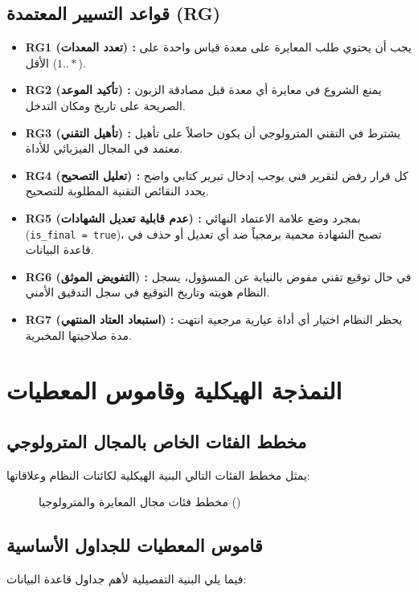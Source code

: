 \documentclass{bts-report-ar}
\begin{document}
\subsection{قواعد التسيير المعتمدة (RG)}
\begin{itemize}
  \item \textbf{RG1 (تعدد المعدات) :} يجب أن يحتوي طلب المعايرة على معدة قياس واحدة على الأقل ($1..*$).
  \item \textbf{RG2 (تأكيد الموعد) :} يمنع الشروع في معايرة أي معدة قبل مصادقة الزبون الصريحة على تاريخ ومكان التدخل.
  \item \textbf{RG3 (تأهيل التقني) :} يشترط في التقني المترولوجي أن يكون حاصلاً على تأهيل معتمد في المجال الفيزيائي للأداة.
  \item \textbf{RG4 (تعليل التصحيح) :} كل قرار رفض لتقرير فني يوجب إدخال تبرير كتابي واضح يحدد النقائص التقنية المطلوبة للتصحيح.
  \item \textbf{RG5 (عدم قابلية تعديل الشهادات) :} بمجرد وضع علامة الاعتماد النهائي (\texttt{is\_final = true})، تصبح الشهادة محمية برمجياً ضد أي تعديل أو حذف في قاعدة البيانات.
  \item \textbf{RG6 (التفويض الموثق) :} في حال توقيع تقني مفوض بالنيابة عن المسؤول، يسجل النظام هويته وتاريخ التوقيع في سجل التدقيق الأمني.
  \item \textbf{RG7 (استبعاد العتاد المنتهي) :} يحظر النظام اختيار أي أداة عيارية مرجعية انتهت مدة صلاحيتها المخبرية.
\end{itemize}

\section{النمذجة الهيكلية وقاموس المعطيات}
\subsection{مخطط الفئات الخاص بالمجال المترولوجي}
يمثل مخطط الفئات التالي البنية الهيكلية لكائنات النظام وعلاقاتها:

\begin{figure}[H]
  \centering
  \begin{LTR}
  
  \end{LTR}
  \caption{مخطط فئات مجال المعايرة والمترولوجيا ()}
  \label{fig:class-domain}
\end{figure}

\subsection{قاموس المعطيات للجداول الأساسية}
فيما يلي البنية التفصيلية لأهم جداول قاعدة البيانات:
\end{document}
